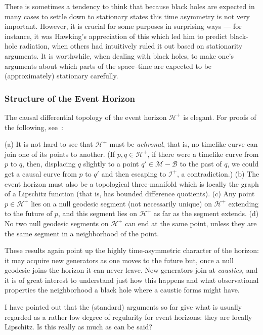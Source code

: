 \documentclass[12pt]{article}
\newcommand{\scrif}{{{\mathscr I}^{+}}}
\newcommand{\B}{{\mathscr B}} %
\newcommand{\Hf}{{{\mathscr H}^{+}}} %
\newcommand{\MM}{{\mathscr M}}
\begin{document}
There is sometimes a tendency to think that because black holes are expected in many cases to settle down to stationary states  this time asymmetry is not very important.  However, it is crucial for some purposes in surprising ways --- for instance, it was Hawking's appreciation of this which led him to predict black-hole radiation, when others had intuitively ruled it out based on stationarity arguments.  It is worthwhile, when dealing with black holes, to make one's arguments about which parts of the space--time are expected to be (approximately) stationary carefully.

\subsubsection{Structure of the Event Horizon}

The causal differential topology of the event horizon $\Hf$ is elegant.  For proofs of the following, see~\citet{Penrose:1972}:

(a) It is not hard to see that $\Hf$ must be {\em achronal}, that is, no timelike curve can join one of its points to another.  
(If $p,q\in\Hf$, if there were a timelike curve from $p$ to $q$, then, displacing $q$ slightly to a point $q'\in \MM -\B$ to the past of $q$, we could get a causal curve from $p$ to $q'$ and then escaping to $\scrif$, a contradiction.)
(b)
The event horizon must also be a topological three-manifold which is locally the graph of a Lipschitz function (that is, has bounded difference quotients).
(c)
Any point $p\in\Hf$ lies on a null geodesic segment (not necessarily unique) on $\Hf$ extending to the future of $p$, and this segment lies on $\Hf$ as far as the segment extends.
(d)
No two null geodesic segments on $\Hf$ can end at the same point, unless they are the same segment in a neighborhood of the point.



These results again point up the highly time-asymmetric character of the horizon:  it may acquire new generators as one moves to the future but, once a null geodesic joins the horizon it can never leave.  New generators join at {\em caustics,} and it is of great interest to understand just how this happens and what observational properties the neighborhood a black hole where a caustic forms might have. 



I have pointed out that the (standard) arguments so far give what is usually regarded as a rather low degree of regularity for event horizons:  they are locally Lipschitz.  Is this really as much as can be said?
\end{document}
